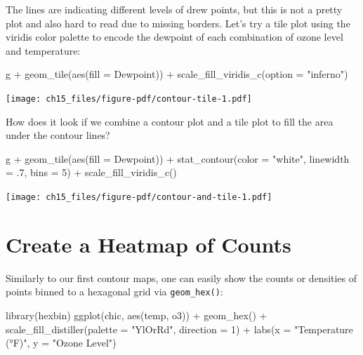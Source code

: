 \documentclass[
  letterpaper,
  DIV=11,
  numbers=noendperiod]{scrreprt}
\newenvironment{Shaded}{\begin{snugshade}}{\end{snugshade}}
\newcommand{\AttributeTok}[1]{\textcolor[rgb]{0.40,0.45,0.13}{#1}}
\newcommand{\DecValTok}[1]{\textcolor[rgb]{0.68,0.00,0.00}{#1}}
\newcommand{\FunctionTok}[1]{\textcolor[rgb]{0.28,0.35,0.67}{#1}}
\newcommand{\NormalTok}[1]{\textcolor[rgb]{0.00,0.23,0.31}{#1}}
\newcommand{\SpecialCharTok}[1]{\textcolor[rgb]{0.37,0.37,0.37}{#1}}
\newcommand{\StringTok}[1]{\textcolor[rgb]{0.13,0.47,0.30}{#1}}
\begin{document}
The lines are indicating different levels of drew points, but this is
not a pretty plot and also hard to read due to missing borders. Let's
try a tile plot using the viridis color palette to encode the dewpoint
of each combination of ozone level and temperature:

\begin{Shaded}
\begin{Highlighting}[]
\NormalTok{g }\SpecialCharTok{+} \FunctionTok{geom\_tile}\NormalTok{(}\FunctionTok{aes}\NormalTok{(}\AttributeTok{fill =}\NormalTok{ Dewpoint)) }\SpecialCharTok{+}
    \FunctionTok{scale\_fill\_viridis\_c}\NormalTok{(}\AttributeTok{option =} \StringTok{"inferno"}\NormalTok{)}
\end{Highlighting}
\end{Shaded}

\texttt{[image: ch15\_files/figure-pdf/contour-tile-1.pdf]}

How does it look if we combine a contour plot and a tile plot to fill
the area under the contour lines?

\begin{Shaded}
\begin{Highlighting}[]
\NormalTok{g }\SpecialCharTok{+} \FunctionTok{geom\_tile}\NormalTok{(}\FunctionTok{aes}\NormalTok{(}\AttributeTok{fill =}\NormalTok{ Dewpoint)) }\SpecialCharTok{+}
    \FunctionTok{stat\_contour}\NormalTok{(}\AttributeTok{color =} \StringTok{"white"}\NormalTok{, }\AttributeTok{linewidth =}\NormalTok{ .}\DecValTok{7}\NormalTok{, }\AttributeTok{bins =} \DecValTok{5}\NormalTok{) }\SpecialCharTok{+}
    \FunctionTok{scale\_fill\_viridis\_c}\NormalTok{()}
\end{Highlighting}
\end{Shaded}

\texttt{[image: ch15\_files/figure-pdf/contour-and-tile-1.pdf]}

\section{Create a Heatmap of Counts}\label{create-a-heatmap-of-counts}

Similarly to our first contour maps, one can easily show the counts or
densities of points binned to a hexagonal grid via \texttt{geom\_hex()}:

\begin{Shaded}
\begin{Highlighting}[]
\FunctionTok{library}\NormalTok{(hexbin)}
\FunctionTok{ggplot}\NormalTok{(chic, }\FunctionTok{aes}\NormalTok{(temp, o3)) }\SpecialCharTok{+}
  \FunctionTok{geom\_hex}\NormalTok{() }\SpecialCharTok{+}
  \FunctionTok{scale\_fill\_distiller}\NormalTok{(}\AttributeTok{palette =} \StringTok{"YlOrRd"}\NormalTok{, }\AttributeTok{direction =} \DecValTok{1}\NormalTok{) }\SpecialCharTok{+}
  \FunctionTok{labs}\NormalTok{(}\AttributeTok{x =} \StringTok{"Temperature (°F)"}\NormalTok{, }\AttributeTok{y =} \StringTok{"Ozone Level"}\NormalTok{)}
\end{Highlighting}
\end{Shaded}
\end{document}
